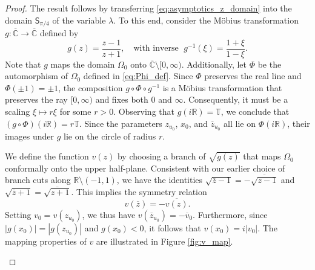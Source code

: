 \documentclass[12pt,oneside,reqno]{amsart}
\theoremstyle{definition}
\numberwithin{equation}{section}
\begin{document}
\begin{proof}
The result follows by transferring \eqref{eq:asymptotics_z_domain} into the domain $\mathsf{S}_{\pi/4}$ of the variable $\lambda$. To this end, consider the Möbius transformation $g:\overline{\mathbb{C}} \to \overline{\mathbb{C}}$ defined by
\[
   g(z) = \frac{z-1}{z+1}, \quad \mbox{with inverse } \;
   g^{-1}(\xi) = \frac{1+\xi}{1-\xi}.
\]
Note that $g$ maps the domain $\Omega_0$ onto $\overline{\mathbb{C}} \setminus [0,\infty)$.
Additionally, let $\Phi$ be the automorphism of $\Omega_0$ defined in \eqref{eq:Phi_def}. Since $\Phi$ preserves the real line and $\Phi(\pm 1) = \pm 1$, the composition $g \circ \Phi \circ g^{-1}$ is a Möbius transformation that preserves the ray $[0,\infty)$ and fixes both $0$ and $\infty$. Consequently, it must be a scaling $\xi \mapsto r \xi$ for some $r>0$. Observing that $g(i\mathbb{R}) = \mathbb{T}$, we conclude that $(g \circ \Phi)(i\mathbb{R}) = r\mathbb{T}$. Since the parameters $z_{u_0}$, $x_0$, and $\overline{z}_{u_0}$ all lie on $\Phi(i\mathbb{R})$, their images under $g$ lie on the circle of radius $r$.

We define the function $v(z)$ by choosing a branch of $\sqrt{g(z)}$ that maps $\Omega_0$ conformally onto the upper half-plane. Consistent with our earlier choice of branch cuts along $\mathbb{R} \setminus (-1,1)$, we have the identities $\sqrt{\overline{z}-1} = -\overline{\sqrt{z-1}}$ and $\sqrt{\overline{z}+1} = \overline{\sqrt{z+1}}$. This implies the symmetry relation
\[
   v(\overline{z}) = -\overline{v(z)}.
\]
Setting $v_0 = v(z_{u_0})$, we thus have $v(\overline{z}_{u_0}) = -\overline{v}_0$. Furthermore, since $|g(x_0)| = |g(z_{u_0})|$ and $g(x_0)<0$, it follows that $v(x_0) = i|v_0|$. The mapping properties of $v$ are illustrated in Figure \ref{fig:v_map}.



\begin{figure}[h]
\begin{center}
\end{center}
\end{figure}
\end{proof}
\end{document}
